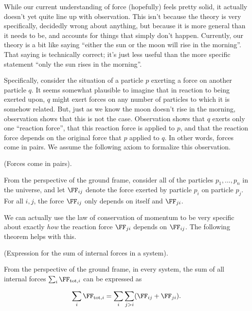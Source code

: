 \documentclass{article}
\begin{document}
While our current understanding of force (hopefully) feels pretty solid, it actually doesn't yet quite line up with observation. This isn't because the theory is very specifically, decidedly wrong about anything, but because it is more general than it needs to be, and accounts for things that simply don't happen. Currently, our theory is a bit like saying ``either the sun or the moon will rise in the morning''. That saying is technically correct; it's just less useful than the more specific statement ``only the sun rises in the morning''.

Specifically, consider the situation of a particle $p$ exerting a force on another particle $q$. It seems somewhat plausible to imagine that in reaction to being exerted upon, $q$ might exert forces on any number of particles to which it is somehow related. But, just as we know the moon doesn't rise in the morning, observation shows that this is not the case. Observation shows that $q$ exerts only one ``reaction force'', that this reaction force is applied to $p$, and that the reaction force depends on the original force that $p$ applied to $q$. In other words, forces come in pairs. We assume the following axiom to formalize this observation.

\begin{axiom}
	(Forces come in pairs).
	
	From the perspective of the ground frame, consider all of the particles $p_1, ..., p_n$ in the universe, and let $\FF_{ij}$ denote the force exerted by particle $p_i$ on particle $p_j$. For all $i, j$, the force $\FF_{ij}$ only depends on itself and $\FF_{ji}$.
\end{axiom}

We can actually use the law of conservation of momentum to be very specific about exactly \textit{how} the reaction force $\FF_{ji}$ depends on $\FF_{ij}$. The following theorem helps with this.

\begin{lemma}
	(Expression for the sum of internal forces in a system).	
	
	From the perspective of the ground frame, in every system, the sum of all internal forces $\sum_i \FF_{\text{tot}, i}$ can be expressed as
	
	\begin{align*}
		\sum_i \FF_{\text{tot}, i} = \sum_i \sum_{j > i} (\FF_{ij} + \FF_{ji}).	
	\end{align*}
\end{lemma}
\end{document}

